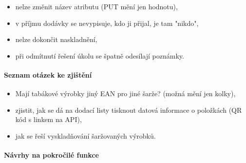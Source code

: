 \begin{itemize}
	\item nelze změnit název atributu (PUT mění jen hodnotu),
	\item v příjmu dodávky se nevypisuje, kdo ji přijal, je tam "nikdo",
	\item nelze dokončit naskladnění,
	\item při odmítnutí řešení úkolu se špatně odesílají poznámky.
\end{itemize}

\paragraph{Seznam otázek ke zjištění}

\begin{itemize}
	\item Mají tabákové výrobky jiný EAN pro jiné šarže? (možná mění jen kolky),
	\item zjistit, jak se dá na dodací listy tisknout datová informace o položkách (QR kód s linkem na API),
	\item jak se řeší vyskladňování šaržovaných výrobků.
\end{itemize}

\paragraph{Návrhy na pokročilé funkce}

